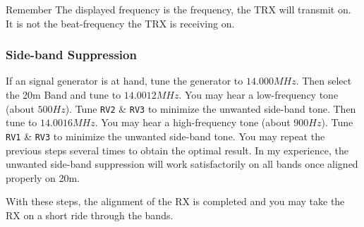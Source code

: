 \documentclass[10pt, a4paper,twoside]{scrartcl}
\newenvironment{remember}{\begin{bclogo}[couleur=blue!30,arrondi=.1,logo=\bccrayon,ombre=true]{Remember}}{\end{bclogo}}
\begin{document}
\begin{remember}
The displayed frequency is the frequency, the TRX will transmit on. It is not the beat-frequency the TRX is receiving on.
\end{remember}

\subsubsection{Side-band Suppression}
If an signal generator is at hand, tune the generator to $14.000 MHz$. Then select the 20m Band and tune to $14.0012 MHz$. You may hear a low-frequency tone (about $500Hz$). Tune \texttt{RV2} \& \texttt{RV3} to minimize the unwanted side-band tone. Then tune to $14.0016 MHz$. You may hear a high-frequency tone (about $900 Hz$). Tune \texttt{RV1} \& \texttt{RV3} to minimize the unwanted side-band tone. You may repeat the previous steps several times to obtain the optimal result. In my experience, the unwanted side-band suppression will work satisfactorily on all bands once aligned properly on 20m. 

With these steps, the alignment of the RX is completed and you may take the RX on a short ride through the bands.

\clearpage
\end{document}
